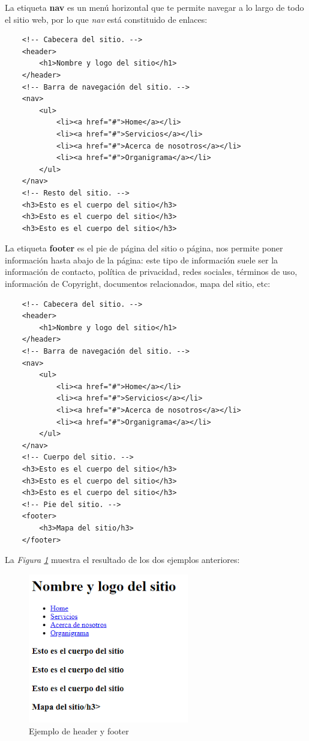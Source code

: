 La etiqueta \textbf{nav} es un menú horizontal que te permite navegar a lo largo de todo el sitio web, por lo que \textit{nav} está constituido de enlaces:
\begin{lstlisting}
    <!-- Cabecera del sitio. -->
    <header>
        <h1>Nombre y logo del sitio</h1>
    </header>
    <!-- Barra de navegación del sitio. -->
    <nav>
        <ul>
            <li><a href="#">Home</a></li>
            <li><a href="#">Servicios</a></li>
            <li><a href="#">Acerca de nosotros</a></li>
            <li><a href="#">Organigrama</a></li>
        </ul>
    </nav>
    <!-- Resto del sitio. -->
    <h3>Esto es el cuerpo del sitio</h3>
    <h3>Esto es el cuerpo del sitio</h3>
    <h3>Esto es el cuerpo del sitio</h3>
\end{lstlisting}


La etiqueta \textbf{footer} es el pie de página del sitio o página, nos permite poner información hasta abajo de la página: este tipo de información suele ser la información de contacto, política de privacidad, redes sociales, términos de uso, información de Copyright, documentos relacionados, mapa del sitio, etc:
\begin{lstlisting}
    <!-- Cabecera del sitio. -->
    <header>
        <h1>Nombre y logo del sitio</h1>
    </header>
    <!-- Barra de navegación del sitio. -->
    <nav>
        <ul>
            <li><a href="#">Home</a></li>
            <li><a href="#">Servicios</a></li>
            <li><a href="#">Acerca de nosotros</a></li>
            <li><a href="#">Organigrama</a></li>
        </ul>
    </nav>
    <!-- Cuerpo del sitio. -->
    <h3>Esto es el cuerpo del sitio</h3>
    <h3>Esto es el cuerpo del sitio</h3>
    <h3>Esto es el cuerpo del sitio</h3>
    <!-- Pie del sitio. -->
    <footer>
        <h3>Mapa del sitio/h3>
    </footer>
\end{lstlisting}

La \textit{Figura \ref{fig: 14}} muestra el resultado de los dos ejemplos anteriores:
\begin{figure}[H]
    \centering
    \caption{Ejemplo de header y footer}
    \label{fig: 14}
    \includegraphics[width=7cm]{ss_html/header_footer.png}
\end{figure}

